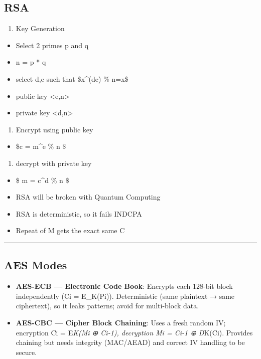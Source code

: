\documentclass{article}
\begin{document}
\subsection{RSA}
\begin{enumerate}
  \item Key Generation
\end{enumerate}
\begin{itemize}
  \item Select 2 primes p and q
  \item n = p * q
  \item select d,e such that \$x^(de) \% n=x\$
  \item public key <e,n>
  \item private key <d,n>
\end{itemize}
\begin{enumerate}
  \item Encrypt using public key
\end{enumerate}
\begin{itemize}
  \item \$c = m^e \% n \$
\end{itemize}
\begin{enumerate}
  \item decrypt with private key
\end{enumerate}
\begin{itemize}
  \item \$ m = c^d \% n \$
  \item RSA will be broken with Quantum Computing
  \item RSA is deterministic, so it fails INDCPA
  \item Repeat of M gets the exact same C
\end{itemize}

\hrule

\subsection{AES Modes}
\begin{itemize}
  \item \textbf{AES-ECB — Electronic Code Book}: Encrypts each 128-bit block independently (Ci = E_K(Pi)). Deterministic (same plaintext → same ciphertext), so it leaks patterns; avoid for multi-block data.
\end{itemize}

\begin{itemize}
  \item \textbf{AES-CBC — Cipher Block Chaining}: Uses a fresh random IV; encryption Ci = E\textit{K(Mi ⊕ Ci-1), decryption Mi = Ci-1 ⊕ D}K(Ci). Provides chaining but needs integrity (MAC/AEAD) and correct IV handling to be secure.
\end{itemize}
\end{document}
